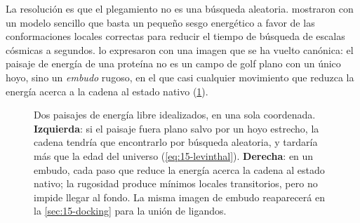\begin{simbolos}
\end{simbolos}

La resolución es que el plegamiento no es una búsqueda aleatoria. \textcite{c15-zwanzig1992} mostraron con un modelo sencillo que basta un pequeño sesgo energético a favor de las conformaciones locales correctas para reducir el tiempo de búsqueda de escalas cósmicas a segundos. \textcite{c15-dill1997} lo expresaron con una imagen que se ha vuelto canónica: el paisaje de energía de una proteína no es un campo de golf plano con un único hoyo, sino un \emph{embudo} rugoso, en el que casi cualquier movimiento que reduzca la energía acerca a la cadena al estado nativo (\cref{fig:15-embudo}).

\begin{figure}[t]
\centering
{}
\caption[Paisajes de energía del plegamiento]{Dos paisajes de energía libre idealizados, en una sola coordenada. \textbf{Izquierda}: si el paisaje fuera plano salvo por un hoyo estrecho, la cadena tendría que encontrarlo por búsqueda aleatoria, y tardaría más que la edad del universo (\cref{eq:15-levinthal}). \textbf{Derecha}: en un embudo, cada paso que reduce la energía acerca la cadena al estado nativo; la rugosidad produce mínimos locales transitorios, pero no impide llegar al fondo. La misma imagen de embudo reaparecerá en la \cref{sec:15-docking} para la unión de ligandos.}
\label{fig:15-embudo}
\end{figure}

